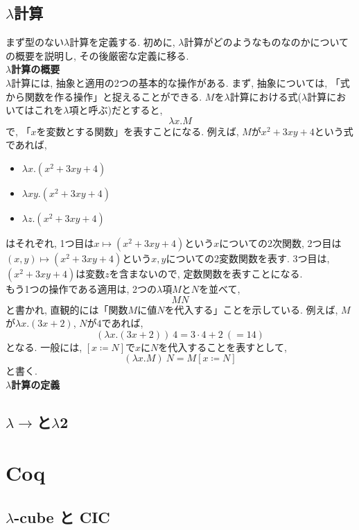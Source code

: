 \documentclass[11pt]{jarticle}
\theoremstyle{mystyle}
\newcommand{\0}{\textbf{0}}
\newcommand{\1}{\textbf{1}}
\newcommand{\2}{\textbf{2}}
\newcommand{\lama}{\lambda \! \! \to}
\begin{document}
\subsection{$\lambda$計算} \label{sssec lambdacal}
まず型のない$\lambda$計算を定義する. 初めに, $\lambda$計算がどのようなものなのかについての概要を説明し, その後厳密な定義に移る. \\
\textbf{$\lambda$計算の概要}\\
$\lambda$計算には, 抽象と適用の2つの基本的な操作がある. まず, 抽象については, 「式から関数を作る操作」と捉えることができる. $M$を$\lambda$計算における式($\lambda$計算においてはこれを$\lambda$項と呼ぶ)だとすると, 
\[
  \lambda x . M
\]
で, 「$x$を変数とする関数」を表すことになる. 
例えば, $M$が$x^2 + 3xy + 4$という式であれば, 
\begin{itemize}
  \item $\lambda x . (x^2 + 3xy + 4)$
  \item $\lambda xy . (x^2 + 3xy + 4)$
  \item $\lambda z . (x^2 + 3xy + 4)$
\end{itemize}
はそれぞれ, 1つ目は$x \mapsto (x^2 + 3xy + 4)$という$x$についての2次関数, 
2つ目は$(x, y) \mapsto (x^2 + 3xy + 4)$という$x, y$についての2変数関数を表す. 
3つ目は, $(x^2 + 3xy + 4)$は変数$z$を含まないので, 定数関数を表すことになる. \\
もう1つの操作である適用は, 2つの$\lambda$項$M$と$N$を並べて, 
\[
  MN
\]
と書かれ, 直観的には「関数$M$に値$N$を代入する」ことを示している. 
例えば, $M$が$\lambda x . (3x + 2)$, $N$が$4$であれば, 
\[
  (\lambda x . (3x + 2))\ 4 = 3 \cdot 4 + 2\ (= 14)
\]
となる. 一般には, $[x \coloneqq N]$で$x$に$N$を代入することを表すとして, 
\[
  (\lambda x. M)\ N = M[x\coloneqq N]
\]
と書く. \\
\textbf{{$\lambda$計算の定義}}
\subsection{$\lama$と$\lambda$2}
\section{Coq} \label{ssec Coq}
\subsection{$\lambda$-cube と CIC}
\end{document}
